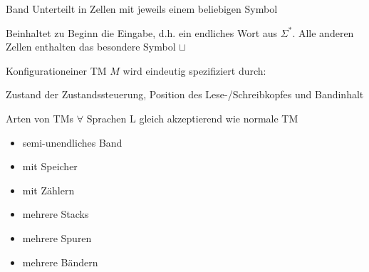 \begin{definition}{Band} Unterteilt in Zellen mit jeweils einem beliebigen Symbol
    
    Beinhaltet zu Beginn die Eingabe, d.h. ein endliches Wort aus $\Sigma^{*}$. Alle anderen Zellen enthalten das besondere Symbol $\sqcup$
\end{definition}

\begin{definition}{Konfiguration}einer TM $M$ wird eindeutig spezifiziert durch:

    Zustand der Zustandssteuerung, Position des Lese-/Schreibkopfes und Bandinhalt
\end{definition}

\begin{concept}{Arten von TMs} $\forall$ Sprachen L gleich akzeptierend wie normale TM

    \vspace{1mm}

    \begin{minipage}{0.45\linewidth}
        \begin{itemize}
            \item semi-unendliches Band
            \item mit Speicher
            \item mit Zählern
        \end{itemize}
    \end{minipage}
    \begin{minipage}{0.45\linewidth}
        \begin{itemize}
            \item mehrere Stacks
            \item mehrere Spuren
            \item mehrere Bändern
        \end{itemize}
    \end{minipage}
\end{concept}



